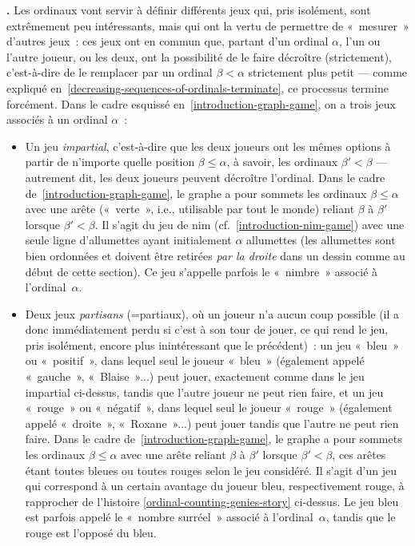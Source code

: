 \documentclass[12pt,a4paper]{article}
\theoremstyle{definition}
\newcommand\thingy{%
\refstepcounter{comcnt}\smallskip\noindent\textbf{\thecomcnt.} }
\begin{document}
\thingy\label{introduction-nimbers-and-numbers}
Les ordinaux vont servir à définir différents jeux qui, pris
isolément, sont extrêmement peu intéressants, mais qui ont la vertu de
permettre de « mesurer » d'autres jeux : ces jeux ont en commun que,
partant d'un ordinal $\alpha$, l'un ou l'autre joueur, ou les deux,
ont la possibilité de le faire décroître (strictement), c'est-à-dire
de le remplacer par un ordinal $\beta < \alpha$ strictement plus petit
— comme expliqué en \ref{decreasing-sequences-of-ordinals-terminate},
ce processus termine forcément.  Dans le cadre esquissé
en \ref{introduction-graph-game}, on a trois jeux associés à un
ordinal $\alpha$ :
\begin{itemize}
\item Un jeu \emph{impartial}, c'est-à-dire que les deux joueurs ont
  les mêmes options à partir de n'importe quelle position $\beta \leq
  \alpha$, à savoir, les ordinaux $\beta' < \beta$ — autrement dit,
  les deux joueurs peuvent décroître l'ordinal.  Dans le cadre
  de \ref{introduction-graph-game}, le graphe a pour sommets les
  ordinaux $\beta \leq \alpha$ avec une arête (« verte », i.e.,
  utilisable par tout le monde) reliant $\beta$ à $\beta'$ lorsque
  $\beta'<\beta$.  Il s'agit du jeu de nim
  (cf. \ref{introduction-nim-game}) avec une seule ligne d'allumettes
  ayant initialement $\alpha$ allumettes (les allumettes sont bien
  ordonnées et doivent être retirées \emph{par la droite} dans un
  dessin comme au début de cette section).  Ce jeu s'appelle parfois
  le « nimbre » associé à l'ordinal $\alpha$.
\item Deux jeux \emph{partisans} (=partiaux), où un joueur n'a aucun
  coup possible (il a donc immédiatement perdu si c'est à son tour de
  jouer, ce qui rend le jeu, pris isolément, encore plus inintéressant
  que le précédent) : un jeu « bleu » ou « positif », dans lequel seul
  le joueur « bleu » (également appelé « gauche », « Blaise »...) peut
  jouer, exactement comme dans le jeu impartial ci-dessus, tandis que
  l'autre joueur ne peut rien faire, et un jeu « rouge » ou
  « négatif », dans lequel seul le joueur « rouge » (également appelé
  « droite », « Roxane »...) peut jouer tandis que l'autre ne peut
  rien faire.  Dans le cadre de \ref{introduction-graph-game}, le
  graphe a pour sommets les ordinaux $\beta \leq \alpha$ avec une
  arête reliant $\beta$ à $\beta'$ lorsque $\beta'<\beta$, ces arêtes
  étant toutes bleues ou toutes rouges selon le jeu considéré.  Il
  s'agit d'un jeu qui correspond à un certain avantage du joueur bleu,
  respectivement rouge, à rapprocher de l'histoire
  \ref{ordinal-counting-genies-story} ci-dessus.  Le jeu bleu est
  parfois appelé le « nombre surréel » associé à l'ordinal $\alpha$,
  tandis que le rouge est l'opposé du bleu.
\end{itemize}
\end{document}
